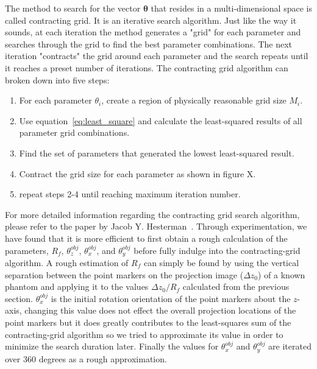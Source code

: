 The method to search for the vector $\boldsymbol{\theta}$ that resides in a multi-dimensional space is called contracting grid.  It is an iterative search algorithm.  Just like the way it sounds, at each iteration the method generates a "grid" for each parameter and searches through the grid to find the best parameter combinations.  The next iteration "contracts" the grid around each parameter and the search repeats until it reaches a preset number of iterations.
The contracting grid algorithm can broken down into five steps:
\begin{enumerate}
\item For each parameter $\theta_i$, create a region of physically reasonable grid size $M_i$.
\item Use equation~\ref{eq:least_square} and calculate the least-squared results of all parameter grid combinations.
\item Find the set of parameters that generated the lowest least-squared result.
\item Contract the grid size for each parameter as shown in figure X.
\item repeat steps 2-4 until reaching maximum iteration number.
\end{enumerate}

For more detailed information regarding the contracting grid search algorithm, please refer to the paper by Jacob Y. Hesterman~\cite{Hesterman2010}.  Through experimentation, we have found that it is more efficient to first obtain a rough calculation of the parameters, $R_f$, $\theta^{obj}_z$, $\theta^{obj}_x$, and $\theta^{obj}_y$ before fully indulge into the contracting-grid algorithm.  A rough estimation of $R_f$ can simply be found by using the vertical separation between the point markers on the projection image ($\Delta z_0$) of a known phantom and applying it to the values $\Delta z_0/R_f$ calculated from the previous section.  $\theta^{obj}_x$ is the initial rotation orientation of the point markers about the $z$-axis, changing this value does not effect the overall projection locations of the point markers but it does greatly contributes to the least-squares sum of the contracting-grid algorithm so we tried to approximate its value in order to minimize the search duration later.  Finally the values for $\theta_x^{obj}$ and $\theta_y^{obj}$ are iterated over 360 degrees as a rough approximation.  


